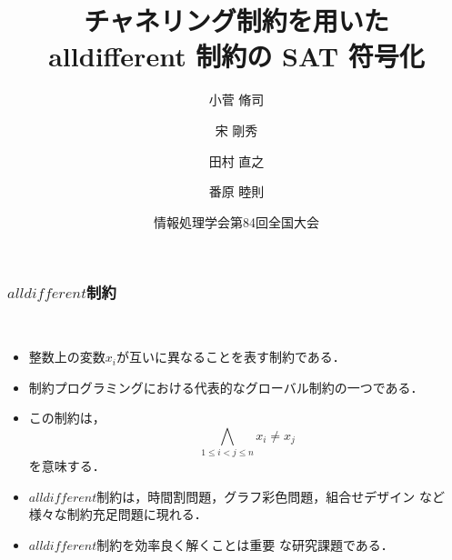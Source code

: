 \documentclass [dvipdfmx,11pt]{beamer}
\title{チャネリング制約を用いた\\ alldifferent 制約の SAT 符号化}
\author{小菅 脩司\inst{1} \and 宋 剛秀\inst{2} \and 田村 直之\inst{2} \and 番原 睦則\inst{1}}
\institute{ \inst{1}名古屋大学 \ \  \inst{2}神戸大学 }
\date{情報処理学会第84回全国大会}
\newcommand{\alldifferent}{$alldifferent$}
\begin{document}
\begin{frame} {}
    \titlepage
\end{frame}




\begin{frame}
    \frametitle{{\alldifferent}制約}
    \begin{alertblock}{}\centering
        \alert{}\\[1em]
        \begin{itemize}
            \item 整数上の変数$x_{i}$が互いに異なることを表す制約である．
            \item 制約プログラミングにおける代表的なグローバル制約の一つである．
        \end{itemize}
    \end{alertblock}
    \begin{itemize}
        \item この制約は，
            $$\bigwedge_{1 \leq i < j \leq n} x_i \neq x_j$$
            を意味する．
        \item {\alldifferent}制約は，時間割問題，グラフ彩色問題，組合せデザイン
            など様々な制約充足問題に現れる．
        \item {\alldifferent}制約を効率良く解くことは重要
            な研究課題である．
    \end{itemize}
\end{frame}
\end{document}
